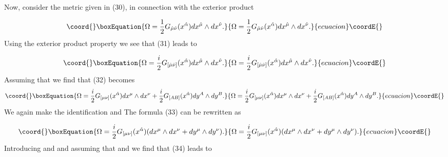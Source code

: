\documentclass[a4paper,12pt]{article}
\begin{document}
Now, consider the metric \coordHE{} given in
(30), in connection with the exterior product

\begin{equation}\coord{}\boxEquation{
\Omega =\frac{1}{2}G_{\hat{\mu}\hat{\nu}}(x^{\hat{\alpha}})dx^{\hat{\mu}
}\wedge dx^{\hat{\nu}}.  \label{31}
}{
\Omega =\frac{1}{2}G_{\hat{\mu}\hat{\nu}}(x^{\hat{\alpha}})dx^{\hat{\mu}
}\wedge dx^{\hat{\nu}}.  }{ecuacion}\coordE{}\end{equation}
Using the exterior product property \coordHE{} we see that (31) leads to

\begin{equation}\coord{}\boxEquation{
\Omega =\frac{i}{2}G_{[\hat{\mu}\hat{\nu}]}(x^{\hat{\alpha}})dx^{\hat{\mu}
}\wedge dx^{\hat{\nu}}.  \label{32}
}{
\Omega =\frac{i}{2}G_{[\hat{\mu}\hat{\nu}]}(x^{\hat{\alpha}})dx^{\hat{\mu}
}\wedge dx^{\hat{\nu}}.  }{ecuacion}\coordE{}\end{equation}
Assuming that \coordHE{} we find that (32) becomes 
\begin{equation}\coord{}\boxEquation{
\Omega =\frac{i}{2}G_{[\mu \nu ]}(x^{\hat{\alpha}})dx^{\mu }\wedge dx^{\nu }+
\frac{i}{2}G_{[AB]}(x^{\hat{\alpha}})dy^{A}\wedge dy^{B}.  \label{33}
}{
\Omega =\frac{i}{2}G_{[\mu \nu ]}(x^{\hat{\alpha}})dx^{\mu }\wedge dx^{\nu }+
\frac{i}{2}G_{[AB]}(x^{\hat{\alpha}})dy^{A}\wedge dy^{B}.  }{ecuacion}\coordE{}\end{equation}
We again make the identification \coordHE{} and \coordHE{} The formula (33) can be rewritten as

\begin{equation}\coord{}\boxEquation{
\Omega =\frac{i}{2}G_{[\mu \nu ]}(x^{\hat{\alpha}})(dx^{\mu }\wedge dx^{\nu
}+dy^{\mu }\wedge dy^{\nu }).  \label{34}
}{
\Omega =\frac{i}{2}G_{[\mu \nu ]}(x^{\hat{\alpha}})(dx^{\mu }\wedge dx^{\nu
}+dy^{\mu }\wedge dy^{\nu }).  }{ecuacion}\coordE{}\end{equation}
Introducing \coordHE{} and \coordHE{} and
assuming that \coordHE{} and \coordHE{} we find that (34) leads to
\end{document}
